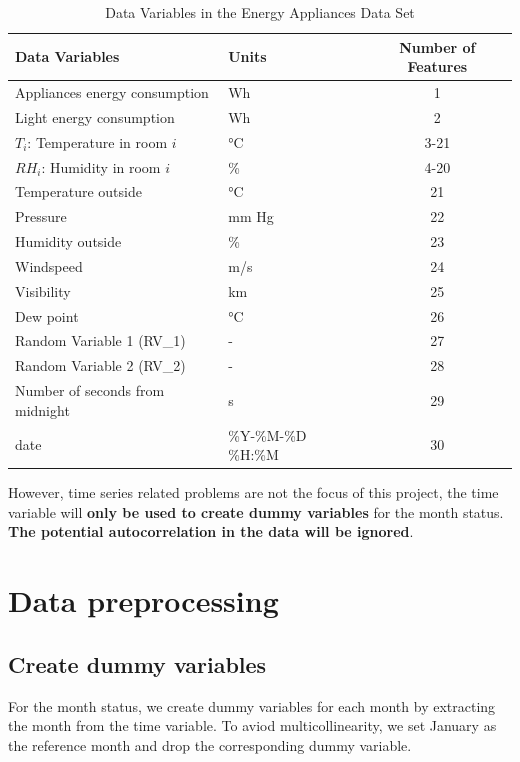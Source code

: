 \documentclass[12pt]{article}
\begin{document}
\begin{table}[!h]
    \centering
    \caption{Data Variables in the Energy Appliances Data Set}
    \begin{tabular}{l l c}
        \toprule
        \textbf{Data Variables} & \textbf{Units} & \textbf{Number of Features} \\
        \midrule
        Appliances energy consumption & Wh & 1 \\
        Light energy consumption & Wh & 2 \\
        $T_i$: Temperature in room $i$ & °C & 3-21 \\
        $RH_i$: Humidity in room $i$ & \% & 4-20 \\
        Temperature outside & °C & 21 \\
        Pressure  & mm Hg & 22 \\
        Humidity outside & \% & 23 \\
        Windspeed & m/s & 24 \\
        Visibility & km & 25 \\
        Dew point & °C & 26 \\
        Random Variable 1 (RV\_1) & - & 27 \\
        Random Variable 2 (RV\_2) & - & 28 \\
        Number of seconds from midnight  & s & 29 \\
        date & \%Y-\%M-\%D \%H:\%M & 30 \\
        \bottomrule
    \end{tabular}
    \label{tab:energy_appliances}
\end{table}

However, time series related problems are not the focus of this project, the time variable will \textbf{only be used to 
create dummy variables} for the month status. \textbf{The potential autocorrelation in the data will be ignored}.

\section{Data preprocessing}
\subsection{Create dummy variables}
For the month status, we create dummy variables for each month by extracting the month from the time variable.
To aviod multicollinearity, we set January as the reference month and drop the corresponding dummy variable.
\end{document}
